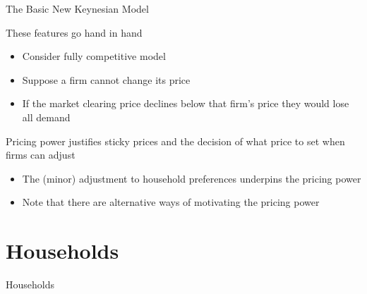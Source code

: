 \documentclass{beamer}
\begin{document}

	
\begin{frame}{The Basic New Keynesian Model}

These features go hand in hand
\begin{itemize}
\item	Consider fully competitive model
\item	Suppose a firm cannot change its price
\item	If the market clearing price declines below that firm's price they would lose all demand
\end{itemize}

\vspace{2mm}
Pricing power justifies sticky prices and the decision of what price to set when firms can adjust
\begin{itemize}
\item	The (minor) adjustment to household preferences underpins the pricing power
\item	Note that there are alternative ways of motivating the pricing power
\end{itemize}

\end{frame}

\section{Households}

\begin{frame}

\begin{center}
{\LARGE Households}
\end{center}

\end{frame}


	
\end{document}
